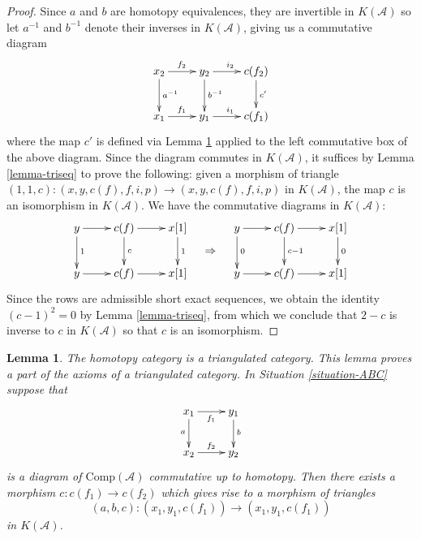 \documentclass{stacks-project}
\newenvironment{slogan}{\comment}{\endcomment}
\theoremstyle{plain}
\newtheorem{lemma}[subsection]{Lemma}
\theoremstyle{definition}
\theoremstyle{remark}
\numberwithin{equation}{subsection}
\begin{document}
\begin{proof}
Since $a$ and $b$ are homotopy equivalences, they are invertible in
$K(\mathcal{A})$ so let $a^{-1}$ and $b^{-1}$ denote their inverses
in $K(\mathcal{A})$, giving us a commutative diagram 
$$
\xymatrix{
x_2\ar[d]^{a^{-1}}\ar[r]^{f_2} &
y_2\ar[d]^{b^{-1}}\ar[r]^{i_2} &
c(f_2)\ar[d]^{c'} \\
x_1\ar[r]^{f_1} &
y_1 \ar[r]^{i_1} &
c(f_1)
}
$$
where the map $c'$ is defined via Lemma \ref{lemma-cone} applied to the left
commutative box of the above diagram. Since the diagram commutes
in $K(\mathcal{A})$, it suffices by Lemma \ref{lemma-triseq} to
prove the following: given a morphism of triangle
$(1,1,c): (x,y,c(f),f,i,p)\to (x,y,c(f),f,i,p)$
in $K(\mathcal{A})$, the map $c$ is an isomorphism in
$K(\mathcal{A})$. We have the commutative diagrams in $K(\mathcal{A})$:
$$
\vcenter{
\xymatrix{
y\ar[d]^{1}\ar[r] &
c(f)\ar[d]^{c}\ar[r] &
x[1]\ar[d]^{1} \\
y\ar[r] &
c(f) \ar[r] &
x[1]
}
}
\quad\Rightarrow\quad
\vcenter{
\xymatrix{
y\ar[d]^{0}\ar[r] &
c(f)\ar[d]^{c-1}\ar[r] &
x[1]\ar[d]^{0} \\
y\ar[r] &
c(f) \ar[r] &
x[1]
}
}
$$
Since the rows are admissible short exact sequences, we obtain
the identity $(c-1)^2 = 0$ by Lemma \ref{lemma-triseq}, from
which we conclude that $2-c$ is inverse to $c$ in $K(\mathcal{A})$
so that $c$ is an isomorphism. 
\end{proof}

\begin{lemma}
\label{lemma-cone}
\begin{slogan}
The homotopy category is a triangulated category.
This lemma proves a part of the axioms of a triangulated category.
\end{slogan}
In Situation \ref{situation-ABC} suppose that
$$
\xymatrix{
x_1 \ar[r]_{f_1} \ar[d]_a & y_1 \ar[d]^b \\
x_2 \ar[r]^{f_2} & y_2
}
$$
is a diagram of $\text{Comp}(\mathcal{A})$ commutative up to homotopy.
Then there exists a morphism $c : c(f_1) \to c(f_2)$ which gives rise to
a morphism of triangles
$$
(a, b, c) : (x_1, y_1, c(f_1)) \to (x_1, y_1, c(f_1))
$$
in $K(\mathcal{A})$.
\end{lemma}
\end{document}
